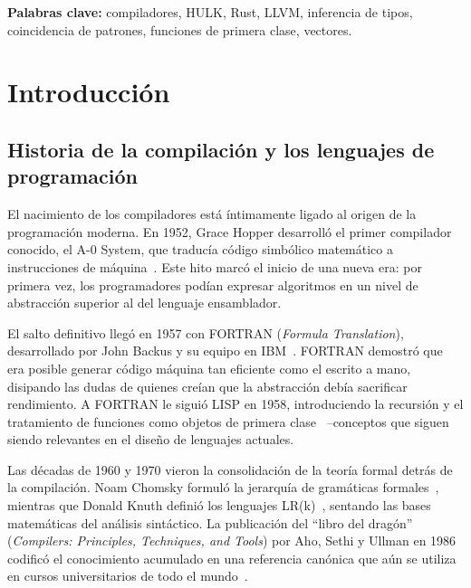 \documentclass[12pt, a4paper]{article}
\begin{document}
\vspace{2em}

\noindent\textbf{Palabras clave:} compiladores, HULK, Rust, LLVM, inferencia de tipos,
coincidencia de patrones, funciones de primera clase, vectores.

\newpage

\tableofcontents
\newpage



\section{Introducción}
\label{sec:intro}

\subsection{Historia de la compilación y los lenguajes de programación}

El nacimiento de los compiladores está íntimamente ligado al origen de la
programación moderna. En 1952, Grace Hopper desarrolló el primer compilador
conocido, el A-0 System, que traducía código simbólico matemático a instrucciones
de máquina~\cite{wexelblat1981}. Este hito marcó el inicio de una nueva era: por primera vez, los
programadores podían expresar algoritmos en un nivel de abstracción superior al
del lenguaje ensamblador.

El salto definitivo llegó en 1957 con FORTRAN (\textit{Formula Translation}),
desarrollado por John Backus y su equipo en IBM~\cite{backus1957}. FORTRAN demostró que era posible
generar código máquina tan eficiente como el escrito a mano, disipando las dudas
de quienes creían que la abstracción debía sacrificar rendimiento. A FORTRAN le
siguió LISP en 1958, introduciendo la recursión y el tratamiento de funciones como
objetos de primera clase~\cite{mccarthy1960} --conceptos que siguen siendo relevantes en el diseño de
lenguajes actuales.

Las décadas de 1960 y 1970 vieron la consolidación de la teoría formal detrás de
la compilación. Noam Chomsky formuló la jerarquía de gramáticas formales~\cite{chomsky1956}, mientras
que Donald Knuth definió los lenguajes LR(k)~\cite{knuth1965}, sentando las bases matemáticas del
análisis sintáctico. La publicación del ``libro del dragón''
(\textit{Compilers: Principles, Techniques, and Tools}) por Aho, Sethi y Ullman
en 1986 codificó el conocimiento acumulado en una referencia canónica que aún se
utiliza en cursos universitarios de todo el mundo~\cite{aho1986}.
\end{document}
